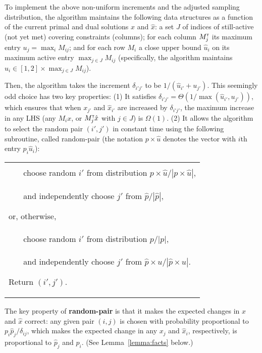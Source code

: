 \documentclass[11pt]{svjour3} \usepackage{fullpage}
\makeatletter
\newcommand{\primalOf}[1]{{{#1}}}
\newcommand{\dualOf}[1]{{\hat{#1}}}
\newcommand{\MM}{M}
\newcommand{\xp}{\primalOf x}
\newcommand{\pp}{\primalOf p}
\newcommand{\wwp}{\primalOf u}
\newcommand{\xd}{\dualOf x}
\newcommand{\pd}{\dualOf p}
\newcommand{\wwd}{\dualOf u}
\newcommand{\dd}{\delta}
\newcommand{\algfont}{}
\newcounter{myline}
\newenvironment{alg}{
  \medskip
  \par
  \algfont
  \centering
    \begin{tabular}{|@{$\!$}|l|}\hline
      \begin{minipage}{0.96\linewidth}\raggedright
          \smallskip
          \begin{list}{\arabic{myline}.}{
            \usecounter{myline}
            \setlength{\listparindent}{0in}
            \setlength{\topsep}{0in}
            \setlength{\itemsep}{.013in}
            \setlength{\parsep}{.013in}
            \setlength{\rightmargin}{0in}
            \setlength{\itemindent}{0in}
\setlength{\labelsep}{0.065in}
            \setlength{\leftmargin}{0.2in}
}
          }{
        \end{list}
        \smallskip
      \end{minipage}\\\hline
    \end{tabular}
    \par
    \noindent
}
\newcommand{\A}{\item}
\newcommand{\Ahead}[1]{\item[]\hspace*{-\leftmargin}{\textrm{#1}}}
\newcommand{\tran}{^{\scriptscriptstyle \sf T\hspace*{-0.05em}}}
\makeatother
\begin{document}
To implement the above non-uniform increments 
and the adjusted sampling distribution,
the algorithm maintains the following data structures
as a function of the current primal and dual solutions $\xp$ and $\xd$:
a set $J$ of indices of still-active (not yet met) covering constraints (columns);
for each column $\MM\tran_j$ its maximum entry $\wwp_j = \max_i \MM_{ij}$;
and for each row $\MM_i$ a close upper bound $\wwd_i$ on its maximum active entry $\max_{j\in J} \MM_{ij}$
(specifically, the algorithm maintains $\wwd_i \in [1,2] \times \max_{j\in J} \MM_{ij}$).

Then, the algorithm takes the increment $\dd_{i'j'}$ to be $1/(\wwd_{i'}+\wwp_{j'})$.
This seemingly odd choice has two key properties:
(1) It satisfies $\dd_{i'j'} = \Theta(1/\max(\wwd_{i'},\wwp_{j'}))$,
which ensures that when $\xp_{j'}$ and $\xd_{i'}$ are increased by $\dd_{i'j'}$,
the maximum increase in any LHS (any $\MM_i\xp$, or $\MM\tran_j\xd$ with $j\in J$)
is $\Omega(1)$.
(2) It allows the algorithm to select the random pair $(i',j')$ in constant time using the following subroutine, called {\algfont random-pair} (the notation $\pp\times\wwd$ denotes the vector with $i$th entry $\pp_i\wwd_i$):



\begin{alg}
\Ahead{{\algfont\bf random-pair}$(\pp, \pd,\pp\times\wwd,\pd\times\wwp)$}

\A With probability
$|\pp\times\wwd| |\pd| / (|\pp\times\wwd| |\pd| + |\pp| |\pd\times\wwp|)$
\\ ~~~ choose random $i'$ from distribution  $\pp\times\wwd/|\pp\times\wwd|$, 
\\ ~~~ and independently choose $j'$ from $\pd/|\pd|$,

\A or, otherwise,
\\ ~~~ choose random $i'$ from distribution $\pp/|\pp|$, 
\\ ~~~ and independently choose $j'$ from $\pd\times\wwp/|\pd\times\wwp|$.

\A Return $(i',j')$.
\end{alg}
\smallskip

The key property of {\bf random-pair} is that it makes
the expected changes in $\xp$ and $\xd$ correct:
any given pair $(i,j)$ is chosen with probability proportional to
$\pp_{i}\pd_{j}/\dd_{ij}$,
which makes the expected change in any $\xp_j$ and $\xd_i$,
respectively, is proportional to $\pd_j$ and $\pp_i$.
(See Lemma~\ref{lemma:facts} below.)
\end{document}
